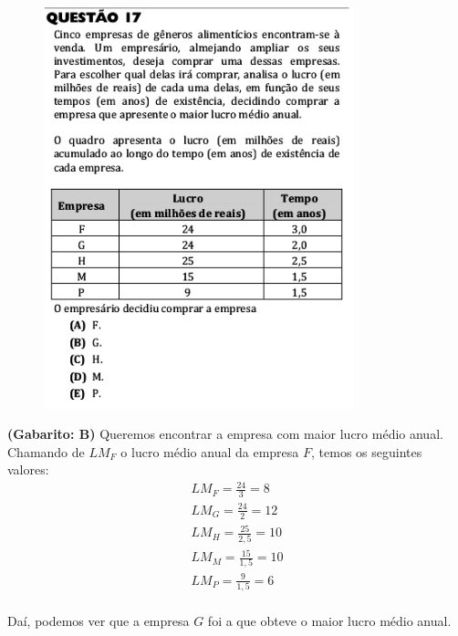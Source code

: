 \documentclass[a4paper]{article}
\begin{document}
\begin{figure}[H]
	\begin{center}
		\includegraphics[width=9cm]{L1Q17.png}
	\end{center}
\end{figure}
\par\textbf{(Gabarito: B)} Queremos encontrar a empresa com maior lucro médio anual. Chamando de $LM_F$ o lucro médio anual da empresa $F$, temos os seguintes valores:
\begin{align*}
LM_F = \frac{24}{3} =  8 \\
LM_G = \frac{24}{2} =  12 \\
LM_H = \frac{25}{2,5} =  10 \\
LM_M = \frac{15}{1,5} =  10 \\
LM_P = \frac{9}{1,5} =  6 \\
\end{align*}
\par\vspace{0.3cm} Daí, podemos ver que a empresa $G$ foi a que obteve o maior lucro médio anual.
\end{document}

